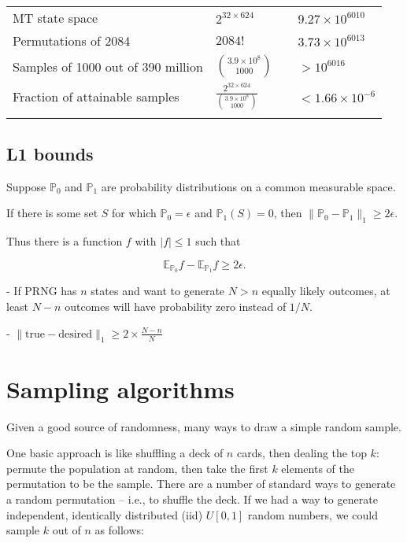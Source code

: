 \documentclass[graybox]{svmult}
\begin{document}
\begin{table}
\begin{tabular}[h]{p{4cm}p{2.4cm}p{4cm}p{2cm}}
MT state space & $2^{32 \times 624}$ & & $9.27\times 10^{6010}$ \\
Permutations of 2084 & $2084!$ &   & $3.73 \times 10^{6013}$ \\
Samples of 1000 out of 390 million & ${3.9\times 10^8 \choose 1000}$ & & $> 10^{6016}$ \\
Fraction of attainable samples & $\frac{2^{32 \times 624}}{{3.9\times 10^8 \choose 1000}}$ &  & $< 1.66 \times 10^{-6}$ \\
\noalign{\smallskip}\svhline\noalign{\smallskip}
\end{tabular}
\end{table}





\subsection{L1 bounds}\label{sec:L1bounds}
Suppose ${\mathbb P}_0$ and ${\mathbb P}_1$ are probability distributions on a common measurable space. 

If there is some set $S$ for which ${\mathbb P}_0 = \epsilon$ and ${\mathbb P}_1(S) = 0$, then $\|{\mathbb P}_0 - {\mathbb P}_1 \|_1 \ge 2 \epsilon$.

Thus there is a function $f$ with $|f| \le 1$ such that 

$${\mathbb E}_{{\mathbb P}_0}f -  {\mathbb E}_{{\mathbb P}_1}f \ge 2 \epsilon.$$

- If PRNG has $n$ states and want to generate $N>n$ equally likely outcomes, at least $N-n$ outcomes will have probability zero instead of $1/N$.

- $\| \mbox{true} - \mbox{desired} \|_1 \ge 2 \times \frac{N-n}{N}$

\section{Sampling algorithms}
\label{sec:algorithms}


Given a good source of randomness, many ways to draw a simple random sample.

One basic approach is like shuffling a deck of $n$ cards, then dealing the top $k$: 
permute the population at random, then take the first $k$ elements of the permutation to be the sample.
There are a number of standard ways to generate a random permutation -- i.e., to shuffle the deck.
If we had a way to generate independent, identically distributed (iid) $U[0,1]$ random numbers, we could sample $k$ out of $n$ as follows:
\end{document}
